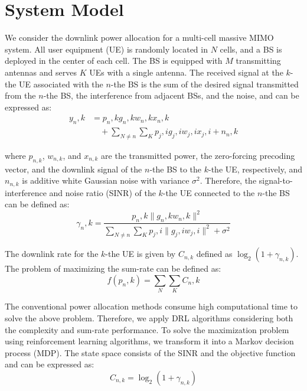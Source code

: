 \documentclass[conference]{IEEEtran}
\begin{document}
\section{System Model}
We consider the downlink power allocation for a multi-cell massive MIMO system. All user equipment (UE) is randomly located in $N$ cells, and a BS is deployed in the center of each cell. The BS is equipped with $M$ transmitting antennas and serves $K$ UEs with a single antenna. The received signal at the $k$-the UE associated with the $n$-the BS is the sum of the desired signal transmitted from the $n$-the BS, the interference from adjacent BSs, and the noise, and can be expressed as:
\begin{equation}
\begin{split}
y_n,k &= p_n,k g_n,k w_n,k x_n,k \\
&\quad + \sum_{N \neq n} \sum_{K} p_j,i g_j,i w_j,i x_j,i + n_n,k
\end{split}
\end{equation}

where $p_{n,k}$, $w_{n,k}$, and $x_{n,k}$ are the transmitted power, the zero-forcing precoding vector, and the downlink signal of the $n$-the BS to the $k$-the UE, respectively, and $n_{n,k}$ is additive white Gaussian noise with variance $\sigma^2$. Therefore, the signal-to-interference and noise ratio (SINR) of the $k$-the UE connected to the $n$-the BS can be defined as:
\begin{equation}
\gamma_n,k = \frac{p_n,k \| g_n,k w_n,k \|^2}{\sum_{N \neq n} \sum_{K} p_j,i \| g_j,i w_j,i \|^2 + \sigma^2}
\end{equation}

The downlink rate for the $k$-the UE is given by $C_{n,k}$ defined as $\log_2 (1 + \gamma_{n,k})$. The problem of maximizing the sum-rate can be defined as:
\begin{equation}
f(p_n,k) = \sum_{N} \sum_{K} C_n,k
\end{equation}

The conventional power allocation methods consume high computational time to solve the above problem. Therefore, we apply DRL algorithms considering both the complexity and sum-rate performance. To solve the maximization problem using reinforcement learning algorithms, we transform it into a Markov decision process (MDP). The state space consists of the SINR and the objective function and can be expressed as:
\begin{equation} C_{n,k} = \log_2 (1 + \gamma_{n,k}) \end{equation}
\end{document}

